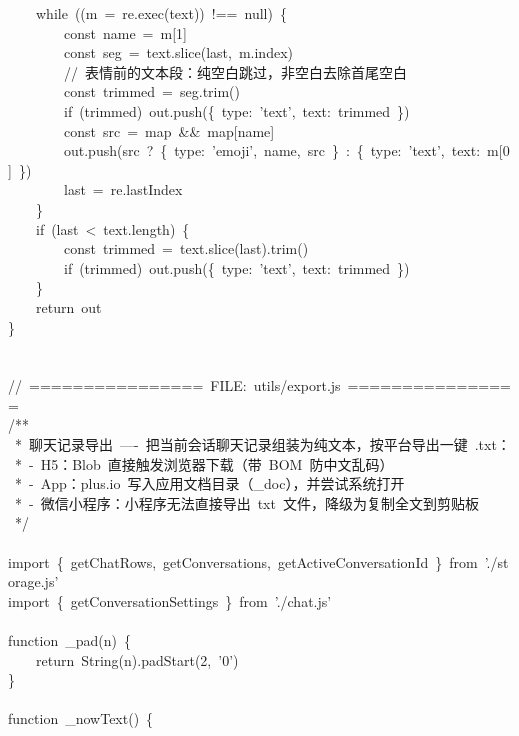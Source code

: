 \documentclass[a4paper,10pt]{article}
\begin{document}
{\ttfamily\footnotesize\raggedright
~~~~while~((m~=~re.exec(text))~!==~null)~\{\\
~~~~~~~~const~name~=~m[1]\\
~~~~~~~~const~seg~=~text.slice(last,~m.index)\\
~~~~~~~~//~表情前的文本段：纯空白跳过，非空白去除首尾空白\\
~~~~~~~~const~trimmed~=~seg.trim()\\
~~~~~~~~if~(trimmed)~out.push(\{~type:~'text',~text:~trimmed~\})\\
~~~~~~~~const~src~=~map~\&\&~map[name]\\
~~~~~~~~out.push(src~?~\{~type:~'emoji',~name,~src~\}~:~\{~type:~'text',~text:~m[0]~\})\\
~~~~~~~~last~=~re.lastIndex\\
~~~~\}\\
~~~~if~(last~<~text.length)~\{\\
~~~~~~~~const~trimmed~=~text.slice(last).trim()\\
~~~~~~~~if~(trimmed)~out.push(\{~type:~'text',~text:~trimmed~\})\\
~~~~\}\\
~~~~return~out\\
\}\\
\mbox{}\\
\mbox{}\\
//~================~FILE:~utils/export.js~================\\
/**\\
~*~聊天记录导出~----~把当前会话聊天记录组装为纯文本，按平台导出一键~.txt：\\
~*~-~H5：Blob~直接触发浏览器下载（带~BOM~防中文乱码）\\
~*~-~App：plus.io~写入应用文档目录（\_doc），并尝试系统打开\\
~*~-~微信小程序：小程序无法直接导出~txt~文件，降级为复制全文到剪贴板\\
~*/\\
\mbox{}\\
import~\{~getChatRows,~getConversations,~getActiveConversationId~\}~from~'./storage.js'\\
import~\{~getConversationSettings~\}~from~'./chat.js'\\
\mbox{}\\
function~\_pad(n)~\{\\
~~~~return~String(n).padStart(2,~'0')\\
\}\\
\mbox{}\\
function~\_nowText()~\{\\
}
\end{document}
